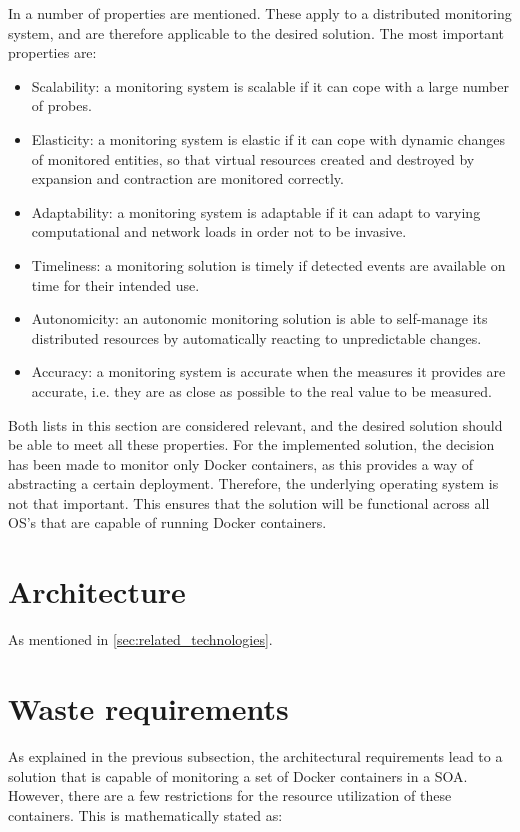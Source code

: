 \noindent
In \cite{aceto2013cloud} a number of properties are mentioned. These apply to a distributed monitoring system, and are therefore applicable to the desired solution. The most important properties are:
\begin{itemize}
    \item Scalability: a monitoring system is scalable if it can cope with a large number of probes.
    \item Elasticity: a monitoring system is elastic if it can cope with dynamic changes of monitored entities, so that virtual resources created and destroyed by expansion and contraction are monitored correctly.
    \item Adaptability: a monitoring system is adaptable if it can adapt to varying computational and network loads in order not to be invasive.
    \item Timeliness: a monitoring solution is timely if detected events are available on time for their intended use.
    \item Autonomicity: an autonomic monitoring solution is able to self-manage its distributed resources by automatically reacting to unpredictable changes.
    \item Accuracy: a monitoring system is accurate when the measures it provides are accurate, i.e. they are as close as possible to the real value to be measured.
\end{itemize}

\noindent
Both lists in this section are considered relevant, and the desired solution should be able to meet all these properties. For the implemented solution, the decision has been made to monitor only Docker containers, as this provides a way of abstracting a certain deployment. Therefore, the underlying operating system is not that important. This ensures that the solution will be functional across all OS's that are capable of running Docker containers. 

\section{Architecture} \label{sec:architecture}
As mentioned in \autoref{sec:related_technologies}.










\section{Waste requirements} \label{sec:waste_requirements}
As explained in the previous subsection, the architectural requirements lead to a solution that is capable of monitoring a set of Docker containers in a SOA. However, there are a few restrictions for the resource utilization of these containers. This is mathematically stated as:

